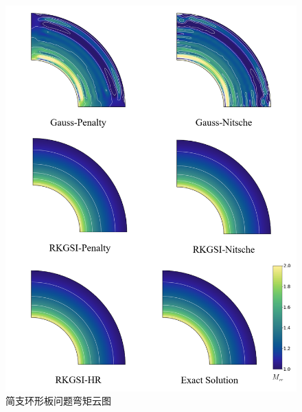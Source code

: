 \begin{figure}[!h]
    \centering
    \includegraphics[scale=0.6]{figure/P/A/Mnn.png}
    \caption{简支环形板问题弯矩云图}\label{AMnn}
\end{figure}\newpage








